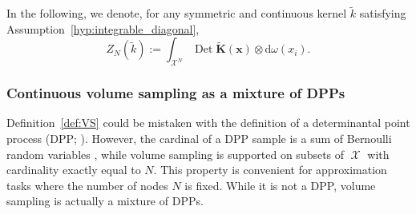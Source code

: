 \documentclass[twoside,11pt]{book}
\newtheorem{definition}{Definition}
\numberwithin{theorem}{chapter}
\numberwithin{definition}{chapter}
\numberwithin{proposition}{chapter}
\numberwithin{corollary}{chapter}
\numberwithin{example}{chapter}
\numberwithin{lemma}{chapter}
\DeclareMathOperator{\Det}{Det}
\DeclareMathOperator{\DPP}{\mathrm{DPP}}
\DeclareMathOperator{\Prb}{\mathbb{P}}
\DeclareMathOperator*{\KDPP}{\mathfrak{K}}
\DeclareMathOperator{\X}{\mathcal{X}}
\newcommand{\rb}[1]{\textcolor{magenta}{#1}}
\begin{document}
In the following, we denote, for any symmetric and continuous kernel $\tilde{k}$ satisfying Assumption~\ref{hyp:integrable_diagonal},
\begin{equation}
Z_{N}(\tilde{k}) := \int_{\X^{N}} \Det \bm{\tilde{K}}(\bm{x}) \otimes\mathrm{d}\omega(x_{i}).
\end{equation}



\subsubsection{Continuous volume sampling as a mixture of DPPs}


Definition~\ref{def:VS} could be mistaken with the definition of a determinantal point process (DPP; \citealp{Mac75}). However, the cardinal of a DPP sample is a sum of Bernoulli random variables \citep{HoKrPeVi06}, while volume sampling is supported on subsets of $\X$ with cardinality exactly equal to $N$. This property is convenient for approximation tasks where the number of nodes $N$ is fixed. While it is not a DPP, volume sampling is actually a mixture of DPPs.


\end{document}
